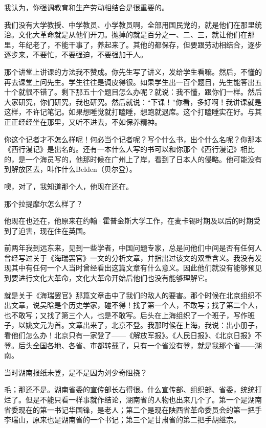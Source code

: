 我认为，你强调教育和生产劳动相结合是很重要的。

我们没有大学教授、中学教员、小学教员啊，全部用国民党的，就是他们在那里统治。文化大革命就是从他们开刀。抛掉的就是百分之一、二、三，就让他们在那里，年纪老了，不能干事了，养起来了。其他的都保存，但要跟劳动相结合，逐步逐步来，不要忙，不要强迫，不要强加于人。

那个讲堂上讲课的方法我不赞成。你先生写了讲义，发给学生看嘛。然后，不懂的再去课堂上问先生。学生往往是调皮得很。如果学生出一百个题目，先生能答出五十个就很不错了。剩下那五十个题目怎么办呢？就说：我不懂，跟你们一样。然后大家研究，你们研究，我也研究。然后就说：“下课！”你看，多好啊！我讲课就是这样，不许记笔记。如果想睡觉就打瞌睡，想跑就退席。这个打瞌睡实在好。与其正正经经坐在那里，又听不进去，不如保养精神。

你这个记者才不怎么样呢！何必当个记者呢？写个什么书，出个什么名呢？你那本《西行漫记》是出名的。还有一本什么人写的书可以和你那个《西行漫记》相比的，是一个海员写的，他那时候在广州上了岸，看到了日本人的侵略。他可能没有到解放区去，叫作什么Belden（贝尔登）。

噢，对了，我知道那个人，他现在还在。

那个拉提摩尔怎么样了？

他现在也还在，他原来在约翰·霍普金斯大学工作，在麦卡锡时期及以后的时期受到了迫害，现在住在英国。

前两年我到远东来，见到一些学者，中国问题专家，总是问他们中间是否有任何人曾经写过关于《海瑞罢官》一文的分析文章，并指出过该文的双重含义。我没有发现其中有任何一个人当时曾经看出这篇文章有什么意义。因此他们就没有能够预见到要进行文化大革命，文化大革命开始后他们也没有能够理解它。

就是关于《海瑞罢官》那篇文章击中了我们的敌人的要害。那个时候在北京组织不出文章，说吴晗是个历史学家，碰不得！找了第一个人，不敢写；找了第二个人，也不敢写；又找了第三个人，也是不敢写。后头在上海组织了一个班子，写作班子，以姚文元为首。文章出来了，北京不登。我那时候在上海，我说：出小册子，看他们怎么办！北京只有一家登了——《解放军报》。《人民日报》、《北京日报》不登。后头全国各地、各省、市都转载了，只有一个省没有登，就是我那个省——湖南。

当时湖南报纸未登，是不是因为刘少奇阻挠？

毛；那还不是。湖南省委的宣传部长右得很。什么宣传部、组织部、省委，统统打烂了。但是不能只看一样事就作结论，湖南省的人物也出来几个了。第一个是湖南省委现在的第一书记华国锋，是老人；第二个是现在陕西省革命委员会的第一把手李瑞山，原来也是湖南省的一个书记；第三个是甘肃省的第二把手胡继宗。

